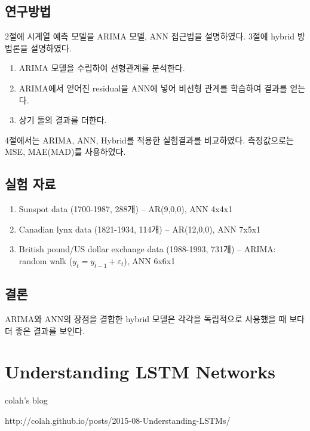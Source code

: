 \documentclass[ %
    a4paper,    %
    amsmath,    %
    itemph,     %
11pt]{oblivoir}     %
\begin{document}
\subsection{연구방법}

2절에 시계열 예측 모델을 ARIMA 모델, ANN 접근법을 설명하였다. 3절에 hybrid 방법론을 설명하였다.


\begin{enumerate}\tightlist
\item ARIMA 모델을 수립하여 선형관계를 분석한다.
\item ARIMA에서 얻어진 residual을 ANN에 넣어 비선형 관계를 학습하여 결과를 얻는다.
\item 상기 둘의 결과를 더한다.
\end{enumerate}

4절에서는 ARIMA, ANN, Hybrid를 적용한 실험결과를 비교하였다. 측정값으로는 MSE, MAE(MAD)를 사용하였다.

\subsection{실험 자료}
\begin{enumerate}\tightlist
\item Sunspot data (1700-1987, 288개) -- AR(9,0,0), ANN 4x4x1
\item Canadian lynx data (1821-1934, 114개) -- AR(12,0,0), ANN 7x5x1
\item British pound/US dollar exchange data (1988-1993, 731개) -- ARIMA: random walk ($y_t= y_{t-1} + \varepsilon_t$), ANN 6x6x1
\end{enumerate}

\subsection{결론}

ARIMA와 ANN의 장점을 결합한 hybrid 모델은 각각을 독립적으로 사용했을 때 보다 더 좋은 결과를 보인다.


\section{Understanding LSTM Networks\cite{lstmblog}}

\begin{description}\tightlist
\item[출처] colah's blog 
\item[학술지] http://colah.github.io/posts/2015-08-Understanding-LSTMs/
\end{description}
\end{document}

